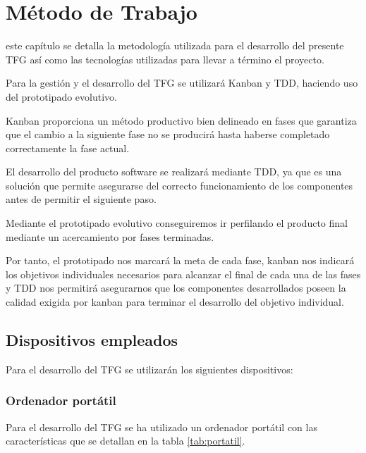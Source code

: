 \chapter{Método de Trabajo}
\label{chap:metodo}

 este capítulo se detalla la metodología utilizada para el desarrollo del presente \ac{TFG} así como las tecnologías utilizadas para llevar a término el proyecto.

Para la gestión y el desarrollo del \ac{TFG} se utilizará Kanban y \ac{TDD}, haciendo uso del prototipado evolutivo.

Kanban proporciona un método productivo bien delineado en fases que garantiza que el cambio a la siguiente fase no se producirá hasta haberse completado correctamente la fase actual.

El desarrollo del producto software se realizará mediante \ac{TDD}, ya que es una solución que permite asegurarse del correcto funcionamiento de los componentes antes de permitir el siguiente paso.

Mediante el prototipado evolutivo conseguiremos ir perfilando el producto final mediante un acercamiento por fases terminadas.

Por tanto, el prototipado nos marcará la meta de cada fase, kanban nos indicará los objetivos individuales necesarios para alcanzar el final de cada una de las fases y \ac{TDD} nos permitirá asegurarnos que los componentes desarrollados poseen la calidad exigida por kanban para terminar el desarrollo del objetivo individual.


\section{Dispositivos empleados}
Para el desarrollo del \ac{TFG} se utilizarán los siguientes dispositivos:

	\subsection{Ordenador portátil}
	
	Para el desarrollo del TFG se ha utilizado un ordenador portátil con las características que se detallan en la tabla \ref{tab:portatil}.
	

